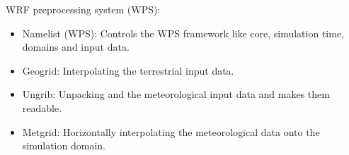 \documentclass{beamer}
\begin{document}
\begin{frame}
\begin{center}
{
	}%
\end{center}
WRF preprocessing system (WPS):
\begin{itemize}
	\item Namelist (WPS): Controls the WPS framework like core, simulation time, domains and input data.
	\item Geogrid: Interpolating the terrestrial input data.
	\item Ungrib: Unpacking and the meteorological input data and makes them readable.
	\item Metgrid: Horizontally interpolating the meteorological data onto the simulation domain.
\end{itemize}
\end{frame}
\end{document}
